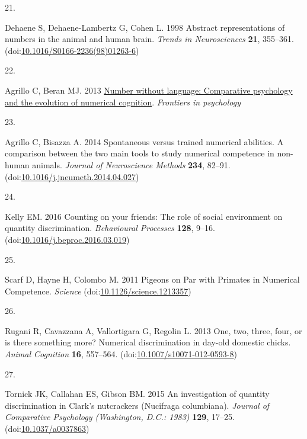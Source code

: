 \documentclass[
  ,doc,floatsintext]{apa6}
\newlength{\cslhangindent}
\newlength{\csllabelwidth}
\newlength{\cslentryspacingunit} %
\newenvironment{CSLReferences}[2] %
 {%
  \setlength{\parindent}{0pt}
  \ifodd #1
  \let\oldpar\par
  \def\par{\hangindent=\cslhangindent\oldpar}
  \fi
  \setlength{\parskip}{#2\cslentryspacingunit}
 }%
 {}
\newcommand{\CSLLeftMargin}[1]{\parbox[t]{\csllabelwidth}{#1}}
\newcommand{\CSLRightInline}[1]{\parbox[t]{\linewidth - \csllabelwidth}{#1}\break}
\begin{document}
\begin{CSLReferences}{0}{0}
\leavevmode{}%
\CSLLeftMargin{21. }%
\CSLRightInline{Dehaene S, Dehaene-Lambertz G, Cohen L. 1998 Abstract representations of numbers in the animal and human brain. \emph{Trends in Neurosciences} \textbf{21}, 355--361. (doi:\href{https://doi.org/10.1016/S0166-2236(98)01263-6}{10.1016/S0166-2236(98)01263-6})}

\leavevmode{}%
\CSLLeftMargin{22. }%
\CSLRightInline{Agrillo C, Beran MJ. 2013 \href{https://www.academia.edu/6879466/Number_without_language_comparative_psychology_and_the_evolution_of_numerical_cognition}{Number without language: Comparative psychology and the evolution of numerical cognition}. \emph{Frontiers in psychology} }

\leavevmode{}%
\CSLLeftMargin{23. }%
\CSLRightInline{Agrillo C, Bisazza A. 2014 Spontaneous versus trained numerical abilities. {A} comparison between the two main tools to study numerical competence in non-human animals. \emph{Journal of Neuroscience Methods} \textbf{234}, 82--91. (doi:\href{https://doi.org/10.1016/j.jneumeth.2014.04.027}{10.1016/j.jneumeth.2014.04.027})}

\leavevmode{}%
\CSLLeftMargin{24. }%
\CSLRightInline{Kelly EM. 2016 Counting on your friends: {The} role of social environment on quantity discrimination. \emph{Behavioural Processes} \textbf{128}, 9--16. (doi:\href{https://doi.org/10.1016/j.beproc.2016.03.019}{10.1016/j.beproc.2016.03.019})}

\leavevmode{}%
\CSLLeftMargin{25. }%
\CSLRightInline{Scarf D, Hayne H, Colombo M. 2011 Pigeons on {Par} with {Primates} in {Numerical} {Competence}. \emph{Science} (doi:\href{https://doi.org/10.1126/science.1213357}{10.1126/science.1213357})}

\leavevmode{}%
\CSLLeftMargin{26. }%
\CSLRightInline{Rugani R, Cavazzana A, Vallortigara G, Regolin L. 2013 One, two, three, four, or is there something more? {Numerical} discrimination in day-old domestic chicks. \emph{Animal Cognition} \textbf{16}, 557--564. (doi:\href{https://doi.org/10.1007/s10071-012-0593-8}{10.1007/s10071-012-0593-8})}

\leavevmode{}%
\CSLLeftMargin{27. }%
\CSLRightInline{Tornick JK, Callahan ES, Gibson BM. 2015 An investigation of quantity discrimination in {Clark}'s nutcrackers ({Nucifraga} columbiana). \emph{Journal of Comparative Psychology (Washington, D.C.: 1983)} \textbf{129}, 17--25. (doi:\href{https://doi.org/10.1037/a0037863}{10.1037/a0037863})}


\end{CSLReferences}
\end{document}

